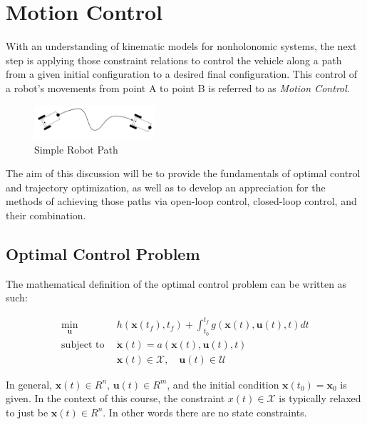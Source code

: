 ﻿\documentclass[twoside]{article}
\begin{document}
\section{Motion Control}

With an understanding of kinematic models for nonholonomic systems, the next step is applying those constraint relations to control the vehicle along a path from a given initial configuration to a desired final configuration. This control of a robot's movements from point A to point B is referred to as \textit{Motion Control}. 

\begin{figure}[H]
\centering
\includegraphics[width=0.4\textwidth]{MotionControl}
\caption{Simple Robot Path}
\end{figure}

The aim of this discussion will be to provide the fundamentals of optimal control and trajectory optimization, as well as to develop an appreciation for the methods of achieving those paths via open-loop control, closed-loop control, and their combination. 

\subsection{Optimal Control Problem}

The mathematical definition of the optimal control problem can be written as such:

\begin{equation} \label{optcont}
\begin{split}
\underset{\mathbf{u}}{\text{min}} \:\: &h(\mathbf{x}(t_f),t_f) + \int_{t_0}^{t_f} g(\mathbf{x}(t),\mathbf{u}(t),t) dt \\
\text{subject to} \:\: &\dot{\mathbf{x}}(t) = a(\mathbf{x}(t),\mathbf{u}(t),t) \\
&\mathbf{x}(t) \in \mathcal{X}, \quad \mathbf{u}(t) \in \mathcal{U}
\end{split}
\end{equation}

In general, $\boldsymbol{x}(t)\in R^{n}$, $\boldsymbol{u}(t)\in R^{m}$, and the initial condition $\boldsymbol{x}(t_0)=\boldsymbol{x}_0$ is given. In the context of this course, the constraint $x(t) \in \mathcal{X}$ is typically relaxed to just be $\boldsymbol{x}(t)\in R^{n}$. In other words there are no state constraints.
\end{document}
